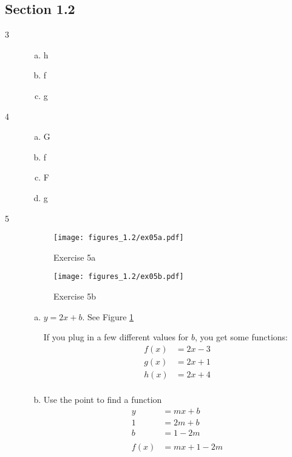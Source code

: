 \documentclass[letterpaper, landscape]{exam}
\begin{document}
    \subsection{Section 1.2}
    \begin{description}

      \item[3]
        \begin{enumerate}[(a)]
          \item h
          \item f
          \item g
        \end{enumerate}

      \item[4]
        \begin{enumerate}[(a)]
          \item G
          \item f
          \item F
          \item g
        \end{enumerate}

      \item[5] 
        \begin{figure}[H]
          \centering
          \texttt{[image: figures\_1.2/ex05a.pdf]}
          \caption{Exercise 5a}
          \label{fig:ex05a}
        \end{figure}

        \begin{figure}[H]
          \centering
          \texttt{[image: figures\_1.2/ex05b.pdf]}
          \caption{Exercise 5b}
          \label{fig:ex05b}
        \end{figure}

        \begin{enumerate}[(a)]
          \item $y = 2x + b$. See Figure \ref{fig:ex05a}

            If you plug in a few different values for $b$, you get some
            functions:
            \begin{align*}
              f(x) &= 2x - 3 \\
              g(x) &= 2x + 1 \\
              h(x) &= 2x + 4 \\
            \end{align*}

          \item
            Use the point to find a function
            \begin{align*}
             y    & = mx + b \\
             1    & = 2m + b \\
             b    & = 1 - 2m \\
             \\
             f(x) & = mx + 1 - 2m \\
            \end{align*}


\end{enumerate}
\end{description}
\end{document}
